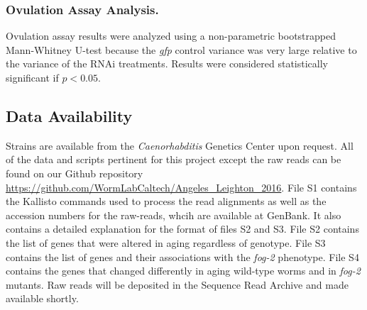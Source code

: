 \documentclass[10pt,letterpaper,twocolumn]{article}
\newcommand{\fog}{\emph{\mbox{fog-2}}}
\begin{document}
\subsubsection*{Ovulation Assay Analysis.}
Ovulation assay results were analyzed using a non-parametric bootstrapped Mann-Whitney U-test because the \emph{gfp} control variance was very large relative to the variance of the RNAi treatments. Results were considered statistically significant if $p<0.05$.


\subsection*{Data Availability}
\label{sb:data_availability}
Strains are available from the \emph{Caenorhabditis} Genetics Center upon request. All of the data and scripts pertinent for this project except the raw reads can be found on our Github repository \url{https://github.com/WormLabCaltech/Angeles_Leighton_2016}. File S1 contains the Kallisto commands used to process the read alignments as well as the accession numbers for the raw-reads, whcih are available at GenBank. It also contains a detailed explanation for the format of files S2 and S3. File S2 contains the list of genes that were altered in aging regardless of genotype. File S3 contains the list of genes and their associations with the \fog{} phenotype. File S4 contains the genes that changed differently in aging wild-type worms and in \fog{} mutants. Raw reads will be deposited in the Sequence Read Archive and made available shortly.
\end{document}
